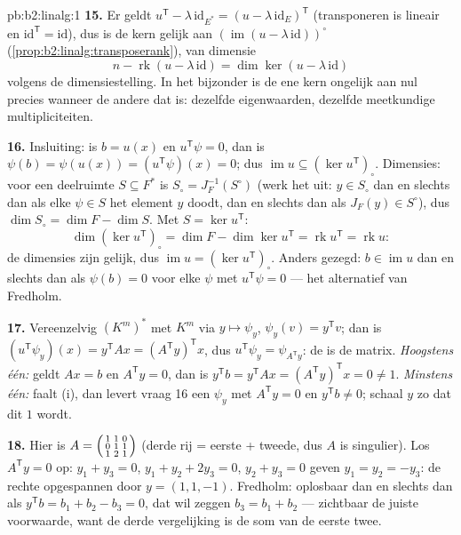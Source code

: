 \begin{solution}{pb:b2:linalg:1}
\textbf{15.} Er geldt $u^{\mathsf T} - \lambda\,\mathrm{id}_{E^*}
= (u - \lambda\,\mathrm{id}_E)^{\mathsf T}$ (transponeren is
lineair en $\mathrm{id}^{\mathsf T} = \mathrm{id}$), dus is de kern
gelijk aan $(\operatorname{im}(u - \lambda\,\mathrm{id}))^\circ$
(\cref{prop:b2:linalg:transposerank}), van dimensie
\[
n - \operatorname{rk}(u - \lambda\,\mathrm{id})
= \dim\ker(u - \lambda\,\mathrm{id})
\]
volgens de dimensiestelling. In het bijzonder is de ene kern
ongelijk aan nul precies wanneer de andere dat is: dezelfde
eigenwaarden, dezelfde meetkundige multipliciteiten.

\textbf{16.} Insluiting: is $b = u(x)$ en $u^{\mathsf T}\psi = 0$,
dan is $\psi(b) = \psi(u(x)) = (u^{\mathsf T}\psi)(x) = 0$; dus
$\operatorname{im} u \subseteq (\ker u^{\mathsf T})_\circ$.
Dimensies: voor een deelruimte $S \subseteq F^*$ is $S_\circ =
J_F^{-1}(S^\circ)$ (werk het uit: $y \in S_\circ$ dan en slechts
dan als elke $\psi \in S$ het element $y$ doodt, dan en slechts
dan als $J_F(y) \in S^\circ$), dus $\dim S_\circ = \dim F - \dim
S$. Met $S = \ker u^{\mathsf T}$:
\[
\dim(\ker u^{\mathsf T})_\circ
= \dim F - \dim\ker u^{\mathsf T}
= \operatorname{rk} u^{\mathsf T} = \operatorname{rk} u :
\]
de dimensies zijn gelijk, dus $\operatorname{im} u = (\ker
u^{\mathsf T})_\circ$. Anders gezegd: $b \in \operatorname{im} u$
dan en slechts dan als $\psi(b) = 0$ voor elke $\psi$ met
$u^{\mathsf T}\psi = 0$ --- het alternatief van Fredholm.

\textbf{17.} Vereenzelvig $(K^m)^*$ met $K^m$ via $y \mapsto
\psi_y$, $\psi_y(v) = y^{\mathsf T}v$; dan is $(u^{\mathsf
T}\psi_y)(x) = y^{\mathsf T}Ax = (A^{\mathsf T}y)^{\mathsf T}x$,
dus $u^{\mathsf T}\psi_y = \psi_{A^{\mathsf T}y}$: de
 is de  matrix.
\emph{Hoogstens één:} geldt $Ax = b$ en $A^{\mathsf T}y = 0$, dan
is $y^{\mathsf T}b = y^{\mathsf T}Ax = (A^{\mathsf T}y)^{\mathsf
T}x = 0 \neq 1$. \emph{Minstens één:} faalt (i), dan levert vraag
16 een $\psi_y$ met $A^{\mathsf T}y = 0$ en $y^{\mathsf T}b \neq
0$; schaal $y$ zo dat dit $1$ wordt.

\textbf{18.} Hier is $A = \begin{psmallmatrix} 1 & 1 & 0\\ 0 & 1 &
1\\ 1 & 2 & 1\end{psmallmatrix}$ (derde rij = eerste + tweede, dus
$A$ is singulier). Los $A^{\mathsf T}y = 0$ op: $y_1 + y_3 = 0$,
$y_1 + y_2 + 2y_3 = 0$, $y_2 + y_3 = 0$ geven $y_1 = y_2 = -y_3$:
de rechte opgespannen door $y = (1, 1, -1)$. Fredholm: oplosbaar
dan en slechts dan als $y^{\mathsf T}b = b_1 + b_2 - b_3 = 0$, dat
wil zeggen $b_3 = b_1 + b_2$ --- zichtbaar de juiste voorwaarde,
want de derde vergelijking is de som van de eerste twee.


\end{solution}
